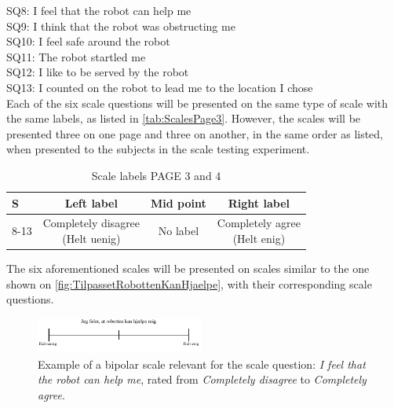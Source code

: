 \noindent
% 
SQ8: I feel that the robot can help me\\%
SQ9: I think that the robot was obstructing me\\%
SQ10: I feel safe around the robot\\%
SQ11: The robot startled me\\ %
SQ12: I like to be served by the robot\\%
SQ13: I counted on the robot to lead me to the location I chose\\%
Each of the six scale questions will be presented on the same type of scale with the same labels, as listed in \autoref{tab:ScalesPage3}. However, the scales will be presented three on one page and three on another, in the same order as listed, when presented to the subjects in the scale testing experiment.
%
\begin{table}[H]
	\centering
\caption{Scale labels PAGE 3 and 4}
	\label{tab:ScalesPage3} 
	\begin{tabular}{l|c|c|c}
		S     & Left label & Mid point & Right label \\\hline
		8-13   & \makecell{Completely disagree\\(Helt uenig)}  & No label & \makecell{Completely agree\\(Helt enig)}                      
	\end{tabular}        
\end{table}
\noindent
%
The six aforementioned scales will be presented on scales similar to the one shown on \autoref{fig:TilpassetRobottenKanHjaelpe}, with their corresponding scale questions. 
%
\begin{figure}[H]
\centering
\includegraphics[width = 0.49\textwidth]{Figure/TilpassetRobottenKanHjaelpe}
\setlength{} 
\caption{Example of a bipolar scale relevant for the scale question: \textit{I feel that the robot can help me}, rated from \textit{Completely disagree} to \textit{Completely agree}.}
\label{fig:TilpassetRobottenKanHjaelpe}
\end{figure}
